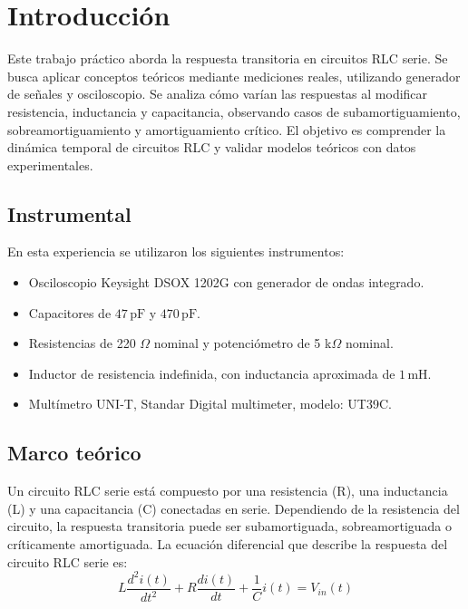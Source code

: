 \documentclass{article}
\begin{document}
\newpage

\tableofcontents %

\newpage

\section{Introducción}
    Este trabajo práctico aborda la respuesta transitoria
     en circuitos RLC serie. Se busca aplicar conceptos 
     teóricos mediante mediciones reales, utilizando generador 
     de señales y osciloscopio. Se analiza cómo varían las
      respuestas al modificar resistencia, inductancia y 
      capacitancia, observando casos de subamortiguamiento,
       sobreamortiguamiento y amortiguamiento crítico. 
       El objetivo es comprender la dinámica temporal 
       de circuitos RLC y validar modelos teóricos
       con datos experimentales.
    \subsection{Instrumental}
        En esta experiencia se utilizaron los siguientes instrumentos:
\begin{itemize}
  \item Osciloscopio Keysight DSOX 1202G con generador de ondas integrado.
  \item Capacitores de $47\,\text{pF}$ y $470\,\text{pF}$.
  \item Resistencias de 220 $\Omega$ nominal y potenciómetro de 5 k$\Omega$ nominal.
  \item Inductor de resistencia indefinida, con inductancia aproximada de $1\,\text{mH}$.
  \item Multímetro UNI-T,  Standar Digital multimeter, modelo: UT39C.
\end{itemize}

    \subsection{Marco teórico}

        Un circuito RLC serie está compuesto por una resistencia (R),
         una 
        inductancia (L) y una capacitancia (C) conectadas en serie.
        Dependiendo de la resistencia del circuito, la respuesta transitoria
         puede ser subamortiguada, sobreamortiguada o críticamente 
         amortiguada. La ecuación diferencial que describe la 
         respuesta del circuito RLC serie es:
        \begin{equation}
            L\frac{d^2i(t)}{dt^2} + R\frac{di(t)}{dt} + \frac{1}{C}i(t) = V_{in}(t)
        \end{equation}
\end{document}
